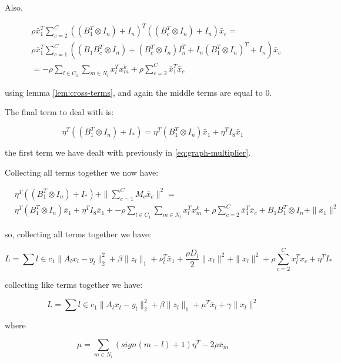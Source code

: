 \documentclass{article}
\begin{document}
Also,

\begin{align*}
&\rho \bar{x}_1^T \sum_{c=2}^C \left(\left( B_1^T \otimes I_n\right)+I_n\right)^T \left(\left( B_c^T \otimes I_n\right)+I_n\right) \bar{x}_c = \\ &\rho\bar{x}_1^T\sum_{c=1}^C\left( \left(B_1B_c^T \otimes I_n\right) + \left(B_c^T \otimes I_n\right)I_n^T
+ I_n\left(B_1^T \otimes I_n\right)^T + I_n\right)\bar{x}_c
\\
&= -\rho\sum_{l\in C_1} \sum_{m\in N_l} x_l^Tx_m^k + \rho\sum_{c=2}^C\bar{x}_1^T\bar{x}_c
\end{align*}

using lemma \ref{lem:cross-terms}, and again the middle terms are equal to \(0\). 

The final term to deal with is:

\begin{equation}
\eta^T\left(\left(B_1^T \otimes I_n\right)+I_*\right) = \eta^T\left(B_1^T \otimes I_n\right)\bar{x}_1 + \eta^TI_8\bar{x}_1
\end{equation}

the first term we have dealt with previously in \eqref{eq:graph-multiplier}.

Collecting all terms together we now have:

\begin{align}
&\eta^T\left(\left(B_1^T \otimes I_n\right)+I_*\right) + \|\sum	_{c=1}^C M_c\bar{x}_c\|^2 = \\
&\eta^T\left(B_1^T \otimes I_n\right)\bar{x}_1 + \eta^TI_8\bar{x}_1 + -\rho\sum_{l\in C_1} \sum_{m\in N_l} x_l^Tx_m^k + \rho\sum_{c=2}^C\bar{x}_1^T\bar{x}_c +  B_1B_1^T \otimes I_n + \|x_1\|^2
\end{align}

so, collecting all terms together we have:

\begin{equation}
L =\sum{l\in c_1} \|A_lx_l - y_l\|_2^2 + \beta\|z_l\|_1  + \nu_l^T\bar{x}_1 + \frac{\rho D_l}{2}\|x_l\|^2 + \|x_l\|^2 + \rho\sum_{c=2}^Cx_l^Tx_c + \eta^TI_*
\end{equation}

collecting like terms together we have:

\begin{equation}
L = \sum{l\in c_1} \|A_lx_l - y_l\|_2^2 + \beta\|z_l\|_1 + \mu^T\bar{x}_l + \gamma\|x_l\|^2
\end{equation}

where

\begin{equation}
\mu = \sum_{m \in N_l}\left(sign\left(m-l\right)+1\right)\eta^T - 2\rho\bar{x}_m
\end{equation}
\end{document}
